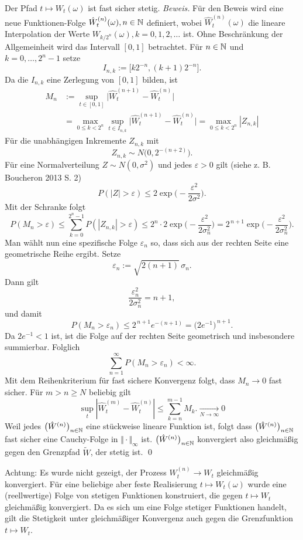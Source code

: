 \begin{satz}
Der Pfad $t \mapsto W_t(\omega)$ ist fast sicher stetig.
\textit{Beweis.}
Für den Beweis wird eine neue Funktionen-Folge $\hat W_t^{(n)}(\omega), n \in \Bbb N$
definiert, wobei $\hat W_t^{(n)}(\omega)$ die lineare Interpolation der Werte $W_{k/2^n}(\omega), k=0,1,2,\ldots$ ist. 
Ohne Beschränkung der Allgemeinheit wird das Intervall $[0,1]$ betrachtet. Für $n \in \Bbb N$ und $k=0,\dots,2^n-1$ setze
$$I_{n,k}:=\big[k2^{-n},(k+1)2^{-n}\big].$$
Da die $I_{n,k}$ eine Zerlegung von $[0,1]$ bilden, ist
$$
\begin{aligned}
M_n &:=\sup_{t\in[0,1]}\big|\hat W^{(n+1)}_t-\hat W^{(n)}_t\big| 
\\ &= \max_{0\le k<2^n} \sup_{t\in I_{n,k}} \big|\hat W^{(n+1)}_t-\hat W^{(n)}_t\big| =\max_{0\le k<2^n}|Z_{n,k}|
\end{aligned}
$$
Für die unabhängigen Inkremente $Z_{n,k}$ mit
$$
Z_{n,k}\sim N\!\big(0,2^{-(n+2)}\big).
$$
Für eine Normalverteilung $Z\sim N(0,\sigma^2)$ und jedes $\varepsilon>0$ gilt (siehe z. B. Boucheron 2013 \cite{boucheron_concentration_2013} S. 2)
$$
P(|Z|>\varepsilon) \le 2\exp\!\Big(-\frac{\varepsilon^2}{2\sigma^2}\Big).
$$
Mit der Schranke folgt
$$
P(M_n>\varepsilon) \le \sum_{k=0}^{2^n-1} P(|Z_{n,k}|>\varepsilon)
\le 2^n\cdot 2\exp\!\Big(-\frac{\varepsilon^2}{2\sigma_n^2}\Big)
= 2^{\,n+1}\exp\!\Big(-\frac{\varepsilon^2}{2\sigma_n^2}\Big).
$$
Man wählt nun eine spezifische Folge $\varepsilon_n$ so, dass sich aus der rechten Seite eine geometrische Reihe ergibt. Setze
$$
\varepsilon_n := \sqrt{2(n+1)}\,\sigma_n.
$$
Dann gilt
$$
\frac{\varepsilon_n^2}{2\sigma_n^2}=n+1,
$$
und damit
$$
P(M_n>\varepsilon_n)\le 2^{\,n+1} e^{-(n+1)} = \big(2e^{-1}\big)^{\,n+1}.
$$
Da $2e^{-1}<1$ ist, ist die Folge auf der rechten Seite geometrisch und insbesondere summierbar. Folglich
$$
\sum_{n=1}^\infty P(M_n>\varepsilon_n) < \infty.
$$
Mit dem Reihenkriterium für fast sichere Konvergenz folgt, dass $M_n\to 0$ fast sicher.
Für $m \gt n \ge N$ beliebig gilt
$$\sup_{t}|\hat W^{(m)}_t - \hat W^{(n)}_t| \leq \sum_{k=n}^{m-1} M_k. \underset{N \to \infty} \longrightarrow 0$$
Weil jedes $\big(\hat W^{(n)}\big)_{n\in\Bbb N}$ eine stückweise lineare Funktion ist, folgt
dass $\big(\hat W^{(n)}\big)_{n\in\Bbb N}$ fast sicher eine Cauchy-Folge in $\Vert \cdot \Vert_{\infty}$ ist.
$\big(\hat W^{(n)}\big)_{n\in\Bbb N}$ konvergiert also gleichmäßig gegen den Grenzpfad $\widetilde W$, der stetig ist. \qed

Achtung: Es wurde nicht gezeigt, der Prozess $W_t^{(n)} \longrightarrow W_t$ gleichmäßig konvergiert. Für eine beliebige aber feste Realisierung
$t \mapsto W_t(\omega)$ wurde eine (reellwertige) Folge von stetigen Funktionen konstruiert, die gegen $t \mapsto W_t$ gleichmäßig konvergiert.
Da es sich um eine Folge stetiger Funktionen handelt, gilt die Stetigkeit unter gleichmäßiger Konvergenz auch gegen die Grenzfunktion $t \mapsto W_t$.
\end{satz}